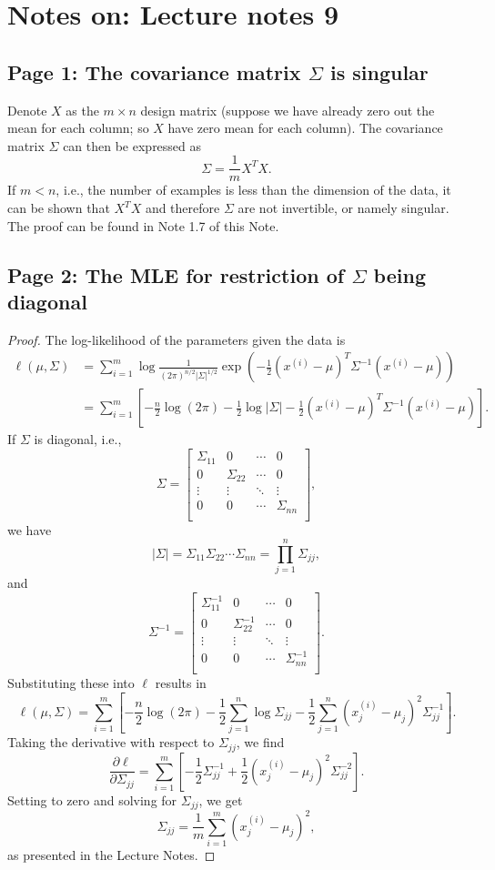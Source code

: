 \documentclass{article}
\begin{document}
\section{Notes on: Lecture notes 9}
\subsection{Page 1: The covariance matrix $\Sigma$ is singular}
Denote $X$ as the $m\times n$ design matrix (suppose we have already zero out the mean for each column; so $X$ have zero mean for each column). The covariance matrix $\Sigma$ can then be expressed as
\[
\Sigma = \frac{1}{m} X^T X.
\]
If $m<n$, i.e., the number of examples is less than the dimension of the data, it can be shown that $X^T X$ and therefore $\Sigma$ are not invertible, or namely singular. The proof can be found in Note 1.7 of this Note.

\subsection{Page 2: The MLE for restriction of $\Sigma$ being diagonal}
\begin{proof}
The log-likelihood of the parameters given the data is
\[
\begin{split}
\ell(\mu,\Sigma)
&=\sum_{i=1}^m\log\frac{1}{(2\pi)^{n/2}|\Sigma|^{1/2}}\exp{\left(-\frac{1}{2}(x^{(i)}-\mu)^T\Sigma^{-1}(x^{(i)}-\mu)\right)}\\
&=\sum_{i=1}^m\left[-\frac{n}{2}\log(2\pi)-\frac{1}{2}\log|\Sigma|-\frac{1}{2}(x^{(i)}-\mu)^T\Sigma^{-1}(x^{(i)}-\mu)\right].
\end{split}
\]
If $\Sigma$ is diagonal, i.e.,
\[
\Sigma=
\begin{bmatrix}
\Sigma_{11} & 0 & \cdots & 0\\
0 & \Sigma_{22} & \cdots & 0 \\
\vdots & \vdots & \ddots & \vdots\\
0 & 0 & \cdots & \Sigma_{nn} \\
\end{bmatrix},
\]
we have
\[
|\Sigma|=\Sigma_{11}\Sigma_{22}\cdots\Sigma_{nn}=\prod_{j=1}^n \Sigma_{jj},
\]
and
\[
\Sigma^{-1}=
\begin{bmatrix}
\Sigma_{11}^{-1} & 0 & \cdots & 0\\
0 & \Sigma_{22}^{-1} & \cdots & 0 \\
\vdots & \vdots & \ddots & \vdots\\
0 & 0 & \cdots & \Sigma_{nn}^{-1} \\
\end{bmatrix}.
\]
Substituting these into $\ell$ results in
\[
\ell(\mu,\Sigma)=\sum_{i=1}^m\left[-\frac{n}{2}\log(2\pi)-\frac{1}{2}\sum_{j=1}^n \log\Sigma_{jj}-\frac{1}{2}\sum_{j=1}^n(x_j^{(i)}-\mu_j)^2\Sigma_{jj}^{-1}\right].
\]
Taking the derivative with respect to $\Sigma_{jj}$, we find
\[
\frac{\partial \ell}{\partial \Sigma_{jj}}
=\sum_{i=1}^m\left[-\frac{1}{2}\Sigma_{jj}^{-1}+\frac{1}{2}(x_j^{(i)}-\mu_j)^2\Sigma_{jj}^{-2}\right].
\]
Setting to zero and solving for $\Sigma_{jj}$, we get
\[
\Sigma_{jj}=\frac{1}{m}\sum_{i=1}^m (x_j^{(i)}-\mu_j)^2,
\]
as presented in the Lecture Notes.
\end{proof}
\end{document}

